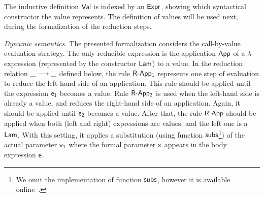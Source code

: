 \documentclass[tese,capa,english]{texufpel}
\newcommand{\D}[1]{\blue{\mathsf{#1}}}
\newcommand{\Con}[1]{\green{\mathsf{#1}}}
\newcommand{\F}[1]{\blue{\mathsf{#1}}}
\newcommand{\V}[1]{\black{\mathsf{#1}}}
\newcommand{\HC}[1]{\green{\mathsf{#1}}}
\begin{document}
The inductive definition \ensuremath{\D{Val}} is indexed by an \ensuremath{\D{Expr}}, showing which syntactical constructor the value represents. The definition of values will be used next, during the formalization of the reduction steps.

\vspace{8pt}
\noindent\emph{Dynamic semantics.} The presented formalization considers the call-by-value evaluation strategy. The only reducible expression is the application \ensuremath{\HC{App}} of a $\lambda$-expression (represented by the constructor \ensuremath{\HC{Lam}}) to a value. In the reduction relation \ensuremath{\F{\_\longrightarrow\_}} defined below, the rule \ensuremath{\Con{R\textrm{-}App_1}} represents one step of evaluation to reduce the left-hand side of an application. This rule should be applied until the expression \ensuremath{\V{e_1}} becomes a value. Rule \ensuremath{\Con{R\textrm{-}App_2}} is used when the left-hand side is already a value, and reduces the right-hand side of an application. Again, it should be applied until \ensuremath{\V{e_2}} becomes a value. After that, the rule \ensuremath{\Con{R\textrm{-}App}} should be applied when both (left and right) expressions are values, and the left one is a \ensuremath{\HC{Lam}}. With this setting, it applies a substitution (using function \ensuremath{\D{subs}}\footnote{We omit the implementation of function \ensuremath{\D{subs}}, however it is available online~\cite{repos}.}) of the actual parameter \ensuremath{\V{v_1}} where the formal parameter \ensuremath{\V{x}} appears in the body expression \ensuremath{\V{e}}.
\end{document}

